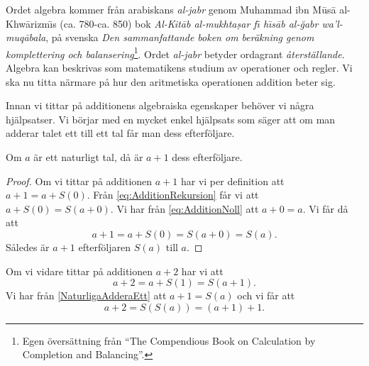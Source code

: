 Ordet algebra kommer från arabiskans \emph{al-jabr} genom Muhammad
ibn M\={u}s\={a} al-Khw\={a}rizm\={\i}s (ca. 780-ca. 850) bok \emph{Al-Kit\={a}b
al-mukhta\d{s}ar f\={\i} h\={\i}s\={a}b al-\u{g}abr wa'l-muq\={a}bala}, på
svenska \emph{Den sammanfattande boken om beräkning genom komplettering och
  balansering}\footnote{%
  Egen översättning från \enquote{The Compendious Book on
  Calculation by Completion and Balancing}.
}.
Ordet \emph{al-jabr} betyder ordagrant \emph{återställande}.
Algebra kan beskrivas som matematikens studium av operationer och regler.
Vi ska nu titta närmare på hur den aritmetiska operationen addition beter sig.

Innan vi tittar på additionens algebraiska egenskaper behöver vi några
hjälpsatser.
Vi börjar med en mycket enkel hjälpsats som säger att om man adderar talet ett
till ett tal får man dess efterföljare.

\begin{lemma}\label{NaturligaAdderaEtt}
  Om \(a\) är ett naturligt tal, då är \(a+1\) dess efterföljare.
\end{lemma}
\begin{proof}
  Om vi tittar på additionen \(a+1\) har vi per definition att \(a+1=a+S(0)\).
  Från \cref{eq:AdditionRekursion} får vi att \(a+S(0)=S(a+0)\).
  Vi har från \cref{eq:AdditionNoll} att \(a+0=a\).
  Vi får då att
  \begin{equation}\label{eq:NaturligaAdderaEtt}
    a+1 = a+S(0) = S(a+0) = S(a).
  \end{equation}
  Således är \(a+1\) efterföljaren \(S(a)\) till \(a\).
\end{proof}

\begin{example}
  Om vi vidare tittar på additionen \(a+2\) har vi att
  \begin{equation*}
    a+2 = a+S(1) = S(a+1).
  \end{equation*}
  Vi har från \cref{NaturligaAdderaEtt} att \(a+1=S(a)\) och vi får att
  \begin{equation*}
    a+2=S(S(a))=(a+1)+1.
  \end{equation*}
\end{example}

